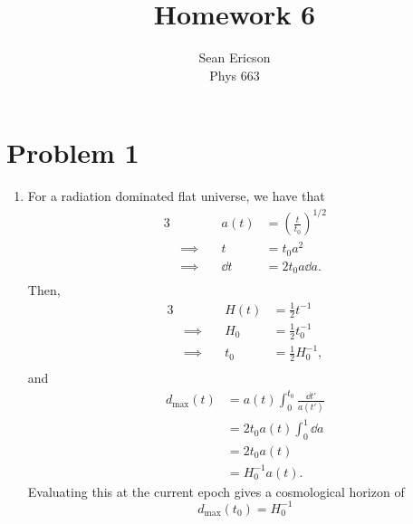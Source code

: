 \documentclass[12pt]{article}
\begin{document}
\title{Homework 6}
\author{Sean Ericson \\ Phys 663}
\maketitle

\section*{Problem 1}
\begin{enumerate}[label=\roman*)]
    \item For a radiation dominated flat universe, we have that
    \begin{alignat*}{3}
        & \quad & a(t) &= \left(\frac{t}{t_0}\right)^{1/2}  \\
        &\implies\quad & t &= t_0 a^2 \\
        &\implies\quad & \dd t &= 2t_0 a\dd a. \\
    \end{alignat*}
    Then,
    \begin{alignat*}{3}
        & \quad & H(t) &= \frac{1}{2}t^{-1}  \\
        &\implies\quad & H_0 &= \frac{1}{2}t_0^{-1} \\
        &\implies\quad & t_0 &= \frac{1}{2}H_0^{-1}, \\
    \end{alignat*}
    and
    \begin{align*}
        d_\text{max}(t) &= a(t)\int_{0}^{t_0} \frac{\dd t'}{a(t')} \\
        &= 2t_0a(t)\int_0^1\dd a \\
        &= 2t_0a(t) \\
        &= H_0^{-1}a(t).
    \end{align*}
    Evaluating this at the current epoch gives a cosmological horizon of 
    \[ \boxed{d_\text{max}(t_0) = H_0^{-1}} \]


\end{enumerate}
\end{document}
